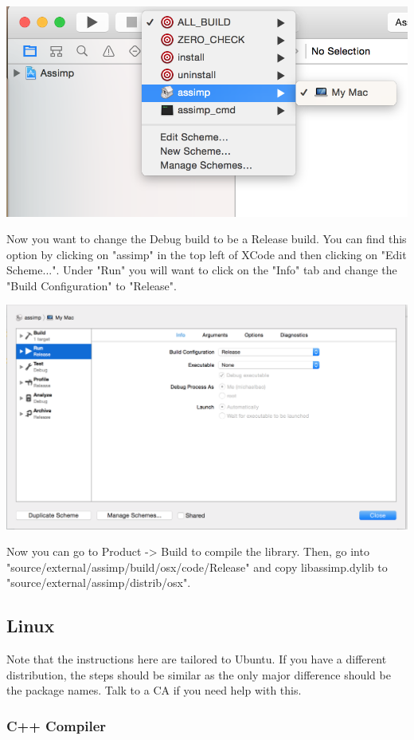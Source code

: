 \documentclass{article}
\begin{document}
\includegraphics[]{assimp2.png}

Now you want to change the Debug build to be a Release build. You can find this option by clicking on "assimp" in the top left of XCode and then clicking on "Edit Scheme...". Under "Run" you will want to click on the "Info" tab and change the "Build Configuration" to "Release".

\includegraphics[width=\linewidth]{assimp3.png}

Now you can go to Product -> Build to compile the library. Then, go into "source/external/assimp/build/osx/code/Release" and copy libassimp.dylib to "source/external/assimp/distrib/osx". 

\subsection*{Linux}

Note that the instructions here are tailored to Ubuntu. If you have a different distribution, the steps should be similar as the only major difference should be the package names. Talk to a CA if you need help with this.

\subsubsection*{C++ Compiler}
\end{document}
